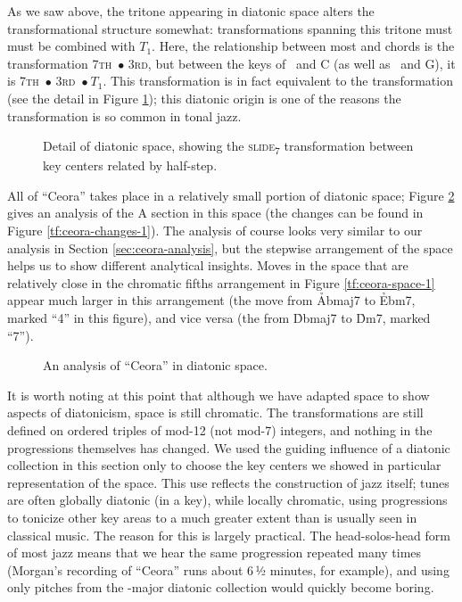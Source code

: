As we saw above, the tritone appearing in diatonic space alters the
transformational structure somewhat: transformations spanning this tritone
must must be combined with $T_1$. Here, the relationship between most
\I and \ii chords is the transformation \textsc{7th}~$\bullet$
\textsc{3rd}, but between the keys of \Dflat\ and C (as well as \Aflat\ and
G), it is \textsc{7th}~$\bullet$ \textsc{3rd}~$\bullet\ T_1$. This transformation
is in fact equivalent to the transformation \slideS (see the detail in Figure
\ref{tfe:diatonic-space-detail}); this diatonic origin is one of the reasons
the \slideS transformation is so common in tonal jazz.

\begin{figure}[tbp]
  \caption{Detail of diatonic \tf space, showing the \textsc{slide}\textsubscript{7}
    transformation between key centers related by half-step.}
  \label{tfe:diatonic-space-detail}
\end{figure}

All of ``Ceora'' takes place in a relatively small portion of diatonic \tf
space; Figure \ref{tfe:ceora-space-diatonic} gives an analysis of the A
section in this space (the changes can be found in Figure
\ref{tf:ceora-changes-1}). The analysis of course looks very similar
to our analysis in Section \ref{sec:ceora-analysis}, but the stepwise
arrangement of the space helps us to show different analytical insights. Moves in
the space that are relatively close in the chromatic fifths arrangement in
Figure \ref{tf:ceora-space-1} appear much larger in this arrangement (the move
from \h{Abmaj7} to \h{Ebm7}, marked ``4'' in this figure), and vice versa (the
\slideS from \h{Dbmaj7} to \h{Dm7}, marked ``7'').

\begin{figure}[tbp]
  \caption{An analysis of ``Ceora'' in diatonic \tf space.}
  \label{tfe:ceora-space-diatonic}
\end{figure}

It is worth noting at this point that although we have adapted \tf space to
show aspects of diatonicism, \tf space is still chromatic. The transformations
are still defined on ordered triples of mod-12 (not mod-7) integers, and
nothing in the \tfo progressions themselves has changed. We used the guiding
influence of a diatonic collection in this section only to choose the key
centers we showed in particular representation of the space. This use reflects
the construction of jazz itself; tunes are often globally diatonic (in a key),
while locally chromatic, using \tfo progressions to tonicize other key areas
to a much greater extent than is usually seen in classical music. The reason
for this is largely practical. The head-solos-head form of most jazz means
that we hear the same progression repeated many times (Morgan's recording of
``Ceora'' runs about 6\,½ minutes, for example), and using only pitches from the
\Aflat-major diatonic collection would quickly become boring.

